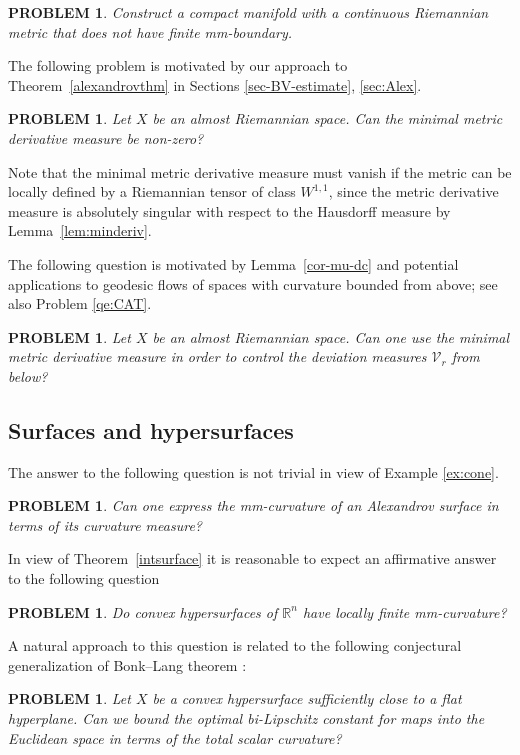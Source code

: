 \documentclass[12pt,leqno,intlimits]{amsart}
\numberwithin{equation}{section}
\newtheorem{quest}[thm]{PROBLEM}
\theoremstyle{definition}
\theoremstyle{remark}
\newcommand{\tref}[1]{Theorem~\ref{#1}}
\newcommand{\lref}[1]{Lemma~\ref{#1}}
\newcommand{\R}{\mathbb{R}}
\begin{document}
\begin{quest}
Construct a compact manifold with a continuous Riemannian metric
that does not have finite mm-boundary.
\end{quest}

The following problem is motivated by our approach to \tref{alexandrovthm} in Sections \ref{sec-BV-estimate}, \ref{sec:Alex}.


\begin{quest} \label{qe:min}
Let $X$ be an almost Riemannian space. Can the minimal metric derivative measure be non-zero?
\end{quest}

Note that the minimal metric derivative measure must vanish if the metric can be locally defined by a Riemannian
tensor of class $W^{1,1}$, since the metric derivative measure is absolutely singular with respect to the Hausdorff measure by \lref{lem:minderiv}.

The following question is motivated by \lref{cor-mu-dc} and potential applications to geodesic flows of spaces with curvature bounded from above; see also Problem \ref{qe:CAT}.

\begin{quest} \label{qe:BV}
Let $X$ be an almost Riemannian space. Can one use the minimal metric derivative measure in order to control the deviation measures $\mathcal{V}_r$ from below?
\end{quest}

\subsection{Surfaces and hypersurfaces}
The answer to the following question is not trivial in view of Example \ref{ex:cone}.

\begin{quest}
Can one express the mm-curvature of an Alexandrov surface in terms of its curvature measure?
\end{quest}

In view of \tref{intsurface} it is reasonable to expect an affirmative answer to the following question
\begin{quest}
Do convex hypersurfaces of $\R^n$ have locally finite mm-curvature?
\end{quest}

A natural approach to this question is related to the following conjectural generalization of Bonk--Lang theorem \cite{Bonk-Lang}:
\begin{quest}
Let $X$ be a convex hypersurface sufficiently close to a flat hyperplane. Can we bound the optimal bi-Lipschitz constant for maps into the Euclidean space in terms of the total scalar curvature?
\end{quest}
\end{document}
